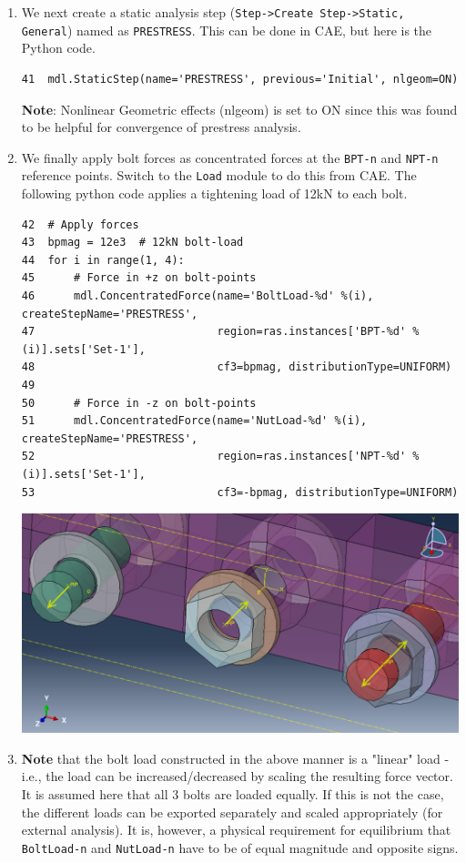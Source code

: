 \documentclass[11pt]{article}
\begin{document}
\begin{enumerate}
\begin{center}
\end{center}
\item We next create a static analysis step (\texttt{Step->Create Step->Static, General}) named as \texttt{PRESTRESS}.
This can be done in CAE, but here is the Python code.
\begin{verbatim}
41  mdl.StaticStep(name='PRESTRESS', previous='Initial', nlgeom=ON)
\end{verbatim}
\textbf{Note}: Nonlinear Geometric effects (nlgeom) is set to ON since this was found to be helpful for convergence of prestress analysis.
\item We finally apply bolt forces as concentrated forces at the \texttt{BPT-n} and \texttt{NPT-n} reference points.
Switch to the \texttt{Load} module to do this from CAE.
The following python code applies a tightening load of 12kN to each bolt.
\begin{verbatim}
42  # Apply forces
43  bpmag = 12e3  # 12kN bolt-load
44  for i in range(1, 4):
45      # Force in +z on bolt-points
46      mdl.ConcentratedForce(name='BoltLoad-%d' %(i), createStepName='PRESTRESS',
47                            region=ras.instances['BPT-%d' %(i)].sets['Set-1'],
48                            cf3=bpmag, distributionType=UNIFORM)
49  
50      # Force in -z on bolt-points
51      mdl.ConcentratedForce(name='NutLoad-%d' %(i), createStepName='PRESTRESS',
52                            region=ras.instances['NPT-%d' %(i)].sets['Set-1'],
53                            cf3=-bpmag, distributionType=UNIFORM)
\end{verbatim}
\begin{center}
\includegraphics[width=.9\linewidth]{./figs/loads.png}
\end{center}
\item \textbf{Note} that the bolt load constructed in the above manner is a "linear" load - i.e., the load can be increased/decreased by scaling the resulting force vector.
It is assumed here that all 3 bolts are loaded equally.
If this is not the case, the different loads can be exported separately and scaled appropriately (for external analysis).
It is, however, a physical requirement for equilibrium that \texttt{BoltLoad-n} and \texttt{NutLoad-n} have to be of equal magnitude and opposite signs.
\end{enumerate}
\end{document}
